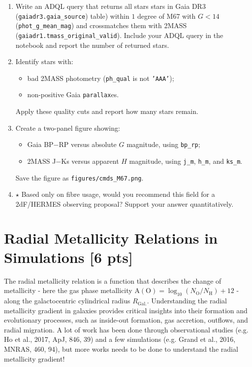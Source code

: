 \documentclass[a4paper,12pt]{article}
\begin{document}
\begin{enumerate}

    \item Write an ADQL query that returns all stars stars in Gaia DR3 (\texttt{gaiadr3.gaia\_source}) table) within $1$ degree of M67 with $G<14$ (\texttt{phot\_g\_mean\_mag}) and crossmatches them with 2MASS (\texttt{gaiadr1.tmass\_original\_valid}). Include your ADQL query in the notebook and report the number of returned stars.

    \item Identify stars with:
    \begin{itemize}
        \item bad 2MASS photometry (\texttt{ph\_qual} is not \texttt{'AAA'});
        \item non-positive Gaia \texttt{parallax}es.
    \end{itemize}
    Apply these quality cuts and report how many stars remain.

    \item Create a two-panel figure showing:
    \begin{itemize}
        \item Gaia BP$-$RP versus absolute $G$ magnitude, using \texttt{bp\_rp};
        \item 2MASS J$-$Ks versus apparent $H$ magnitude, using \texttt{j\_m}, \texttt{h\_m}, and \texttt{ks\_m}.
    \end{itemize}

    Save the figure as \texttt{figures/cmds\_M67.png}.

    \item $\star$ Based only on fibre usage, would you recommend this field for a 2dF/HERMES observing proposal? Support your answer quantitatively.

\end{enumerate}

\section{Radial Metallicity Relations in Simulations \hfill [6 pts]}

The radial metallicity relation is a function that describes the change of metallicity - here the gas phase metallicity $\mathrm{A(O)} = \log_{10}(N_\mathrm{O}/N_\mathrm{H}) + 12$ - along the galactocentric cylindrical radius $R_\mathrm{Gal.}$. Understanding the radial metallicity gradient in galaxies provides critical insights into their formation and evolutionary processes, such as inside-out formation, gas accretion, outflows, and radial migration. A lot of work has been done through observational studies (e.g. Ho et al., 2017, ApJ, 846, 39) and a few simulations (e.g. Grand et al., 2016, MNRAS, 460, 94), but more works needs to be done to understand the radial metallicity gradient!
\end{document}
